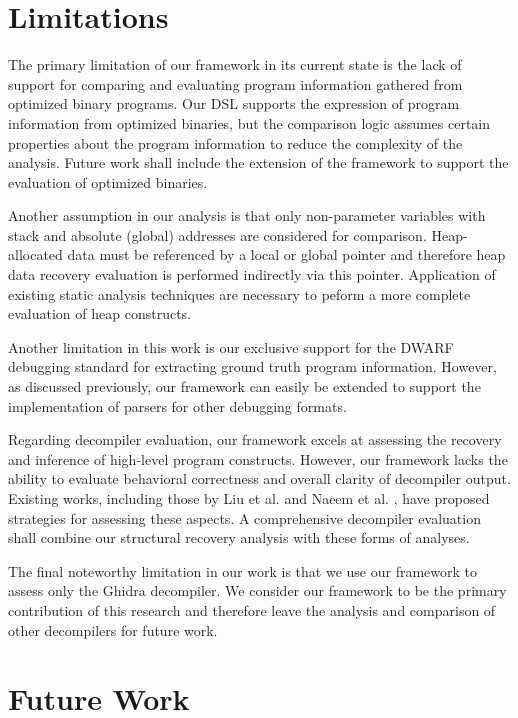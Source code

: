 \section{Limitations}

The primary limitation of our framework in its current state is the lack of support for comparing and evaluating program information gathered from optimized binary programs. Our DSL supports the expression of program information from optimized binaries, but the comparison logic assumes certain properties about the program information to reduce the complexity of the analysis. Future work shall include the extension of the framework to support the evaluation of optimized binaries.

Another assumption in our analysis is that only non-parameter variables with stack and absolute (global) addresses are considered for comparison. Heap-allocated data must be referenced by a local or global pointer and therefore heap data recovery evaluation is performed indirectly via this pointer. Application of existing static analysis techniques are necessary to peform a more complete evaluation of heap constructs.

Another limitation in this work is our exclusive support for the DWARF debugging standard for extracting ground truth program information. However, as discussed previously, our framework can easily be extended to support the implementation of parsers for other debugging formats.

Regarding decompiler evaluation, our framework excels at assessing the recovery and inference of high-level program constructs. However, our framework lacks the ability to evaluate behavioral correctness and overall clarity of decompiler output. Existing works, including those by Liu et al. \cite{bib:how-far-weve-come} and Naeem et al. \cite{bib:metrics-effectiveness-decompilers}, have proposed strategies for assessing these aspects. A comprehensive decompiler evaluation shall combine our structural recovery analysis with these forms of analyses.

The final noteworthy limitation in our work is that we use our framework to assess only the Ghidra decompiler. We consider our framework to be the primary contribution of this research and therefore leave the analysis and comparison of other decompilers for future work.

\section{Future Work}

